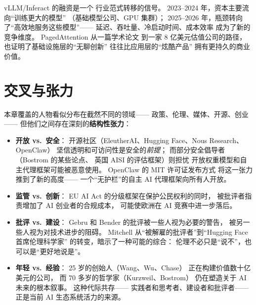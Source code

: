 \begin{keybox}[从训练时代到推理时代]
vLLM/Inferact 的融资是一个
行业范式转移的信号。
2023--2024 年，资本主要流向``训练更大的模型''
（基础模型公司、GPU 集群）；
2025--2026 年，瓶颈转向了``高效地服务这些模型''——
延迟、吞吐量、冷启动时间、成本效率
成为了新的竞争维度。
PagedAttention 从一篇学术论文
到一家 8 亿美元估值公司的路径，
也证明了基础设施层的``无聊创新''
往往比应用层的``炫酷产品''
拥有更持久的商业价值。
\end{keybox}

\section{交叉与张力}
\label{sec:tensions}

本章覆盖的人物看似分布在截然不同的领域——
政策、伦理、媒体、开源、创业——
但他们之间存在深刻的\textbf{结构性张力}：

\begin{itemize}[noitemsep]
  \item \textbf{开放 vs.\ 安全}：
        开源社区（EleutherAI、Hugging Face、Nous Research、OpenClaw）
        坚信透明和可访问性是安全的\emph{前提}；
        而部分安全倡导者（Bostrom 的某些论点、
        英国 AISI 的评估框架）则担忧
        开放权重模型和自主代理框架可能被恶意使用。
        OpenClaw 的 MIT 许可证发布方式
        将这一张力推到了新的高度——
        一个``无护栏''的自主 AI 代理框架向所有人开放。
  \item \textbf{监管 vs.\ 创新}：
        EU AI Act 的分级框架在保护公民权利的同时，
        被批评者指责增加了 AI 创业者的合规成本，
        可能使欧洲在 AI 竞赛中进一步落后。
  \item \textbf{批评 vs.\ 建设}：
        Gebru 和 Bender 的批评被一些人视为必要的警告，
        被另一些人视为对技术进步的阻碍。
        Mitchell 从``被解雇的批评者''到``Hugging Face 首席伦理科学家''
        的转变，暗示了一种可能的综合：
        伦理不必只是``说不''，也可以是``更好地说是''。
  \item \textbf{年轻 vs.\ 经验}：
        25 岁的创始人（Wang、Wu、Chase）
        正在构建价值数十亿美元的公司，
        而 70 多岁的哲学家（Kurzweil、Bostrom）
        仍在塑造关于 AI 未来的根本叙事。
        这种代际共存——
        实践者和思考者、建设者和批评者——
        正是当前 AI 生态系统活力的来源。
\end{itemize}


